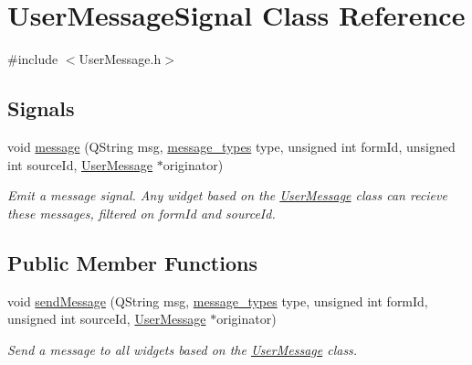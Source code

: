 \hypertarget{classUserMessageSignal}{
\section{UserMessageSignal Class Reference}
\label{classUserMessageSignal}
}


{\ttfamily \#include $<$UserMessage.h$>$}

\subsection*{Signals}
\begin{DoxyCompactItemize}
\item 
\hypertarget{classUserMessageSignal_ae128848c735c1045994350dd81ca590c}{
void \hyperlink{classUserMessageSignal_ae128848c735c1045994350dd81ca590c}{message} (QString msg, \hyperlink{classmessage__types}{message\_\-types} type, unsigned int formId, unsigned int sourceId, \hyperlink{classUserMessage}{UserMessage} $\ast$originator)}
\label{classUserMessageSignal_ae128848c735c1045994350dd81ca590c}

\begin{DoxyCompactList}\small\item\em Emit a message signal. Any widget based on the \hyperlink{classUserMessage}{UserMessage} class can recieve these messages, filtered on formId and sourceId. \end{DoxyCompactList}\end{DoxyCompactItemize}
\subsection*{Public Member Functions}
\begin{DoxyCompactItemize}
\item 
\hypertarget{classUserMessageSignal_a6d9392f8945a02abf6dfb8525bf402b6}{
void \hyperlink{classUserMessageSignal_a6d9392f8945a02abf6dfb8525bf402b6}{sendMessage} (QString msg, \hyperlink{classmessage__types}{message\_\-types} type, unsigned int formId, unsigned int sourceId, \hyperlink{classUserMessage}{UserMessage} $\ast$originator)}
\label{classUserMessageSignal_a6d9392f8945a02abf6dfb8525bf402b6}

\begin{DoxyCompactList}\small\item\em Send a message to all widgets based on the \hyperlink{classUserMessage}{UserMessage} class. \end{DoxyCompactList}\end{DoxyCompactItemize}


